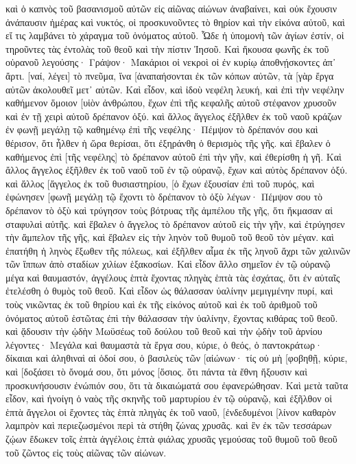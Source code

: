 καὶ ὁ καπνὸς τοῦ βασανισμοῦ αὐτῶν εἰς αἰῶνας αἰώνων ἀναβαίνει, καὶ οὐκ ἔχουσιν ἀνάπαυσιν ἡμέρας καὶ νυκτός, οἱ προσκυνοῦντες τὸ θηρίον καὶ τὴν εἰκόνα αὐτοῦ, καὶ εἴ τις λαμβάνει τὸ χάραγμα τοῦ ὀνόματος αὐτοῦ. 
Ὧδε ἡ ὑπομονὴ τῶν ἁγίων ἐστίν, οἱ τηροῦντες τὰς ἐντολὰς τοῦ θεοῦ καὶ τὴν πίστιν Ἰησοῦ. 
Καὶ ἤκουσα φωνῆς ἐκ τοῦ οὐρανοῦ λεγούσης· Γράψον· Μακάριοι οἱ νεκροὶ οἱ ἐν κυρίῳ ἀποθνῄσκοντες ἀπ᾽ ἄρτι. [ναί, λέγει] τὸ πνεῦμα, ἵνα [ἀναπαήσονται ἐκ τῶν κόπων αὐτῶν, τὰ [γὰρ ἔργα αὐτῶν ἀκολουθεῖ μετ᾽ αὐτῶν. 
Καὶ εἶδον, καὶ ἰδοὺ νεφέλη λευκή, καὶ ἐπὶ τὴν νεφέλην καθήμενον ὅμοιον [υἱὸν ἀνθρώπου, ἔχων ἐπὶ τῆς κεφαλῆς αὐτοῦ στέφανον χρυσοῦν καὶ ἐν τῇ χειρὶ αὐτοῦ δρέπανον ὀξύ. 
καὶ ἄλλος ἄγγελος ἐξῆλθεν ἐκ τοῦ ναοῦ κράζων ἐν φωνῇ μεγάλῃ τῷ καθημένῳ ἐπὶ τῆς νεφέλης· Πέμψον τὸ δρέπανόν σου καὶ θέρισον, ὅτι ἦλθεν ἡ ὥρα θερίσαι, ὅτι ἐξηράνθη ὁ θερισμὸς τῆς γῆς. 
καὶ ἔβαλεν ὁ καθήμενος ἐπὶ [τῆς νεφέλης] τὸ δρέπανον αὐτοῦ ἐπὶ τὴν γῆν, καὶ ἐθερίσθη ἡ γῆ. 
Καὶ ἄλλος ἄγγελος ἐξῆλθεν ἐκ τοῦ ναοῦ τοῦ ἐν τῷ οὐρανῷ, ἔχων καὶ αὐτὸς δρέπανον ὀξύ. 
καὶ ἄλλος [ἄγγελος ἐκ τοῦ θυσιαστηρίου, [ὁ ἔχων ἐξουσίαν ἐπὶ τοῦ πυρός, καὶ ἐφώνησεν [φωνῇ μεγάλῃ τῷ ἔχοντι τὸ δρέπανον τὸ ὀξὺ λέγων· Πέμψον σου τὸ δρέπανον τὸ ὀξὺ καὶ τρύγησον τοὺς βότρυας τῆς ἀμπέλου τῆς γῆς, ὅτι ἤκμασαν αἱ σταφυλαὶ αὐτῆς. 
καὶ ἔβαλεν ὁ ἄγγελος τὸ δρέπανον αὐτοῦ εἰς τὴν γῆν, καὶ ἐτρύγησεν τὴν ἄμπελον τῆς γῆς, καὶ ἔβαλεν εἰς τὴν ληνὸν τοῦ θυμοῦ τοῦ θεοῦ τὸν μέγαν. 
καὶ ἐπατήθη ἡ ληνὸς ἔξωθεν τῆς πόλεως, καὶ ἐξῆλθεν αἷμα ἐκ τῆς ληνοῦ ἄχρι τῶν χαλινῶν τῶν ἵππων ἀπὸ σταδίων χιλίων ἑξακοσίων. 
Καὶ εἶδον ἄλλο σημεῖον ἐν τῷ οὐρανῷ μέγα καὶ θαυμαστόν, ἀγγέλους ἑπτὰ ἔχοντας πληγὰς ἑπτὰ τὰς ἐσχάτας, ὅτι ἐν αὐταῖς ἐτελέσθη ὁ θυμὸς τοῦ θεοῦ. 
Καὶ εἶδον ὡς θάλασσαν ὑαλίνην μεμιγμένην πυρί, καὶ τοὺς νικῶντας ἐκ τοῦ θηρίου καὶ ἐκ τῆς εἰκόνος αὐτοῦ καὶ ἐκ τοῦ ἀριθμοῦ τοῦ ὀνόματος αὐτοῦ ἑστῶτας ἐπὶ τὴν θάλασσαν τὴν ὑαλίνην, ἔχοντας κιθάρας τοῦ θεοῦ. 
καὶ ᾄδουσιν τὴν ᾠδὴν Μωϋσέως τοῦ δούλου τοῦ θεοῦ καὶ τὴν ᾠδὴν τοῦ ἀρνίου λέγοντες· Μεγάλα καὶ θαυμαστὰ τὰ ἔργα σου, κύριε, ὁ θεός, ὁ παντοκράτωρ· δίκαιαι καὶ ἀληθιναὶ αἱ ὁδοί σου, ὁ βασιλεὺς τῶν [αἰώνων· 
τίς οὐ μὴ [φοβηθῇ, κύριε, καὶ [δοξάσει τὸ ὄνομά σου, ὅτι μόνος [ὅσιος. ὅτι πάντα τὰ ἔθνη ἥξουσιν καὶ προσκυνήσουσιν ἐνώπιόν σου, ὅτι τὰ δικαιώματά σου ἐφανερώθησαν. 
Καὶ μετὰ ταῦτα εἶδον, καὶ ἠνοίγη ὁ ναὸς τῆς σκηνῆς τοῦ μαρτυρίου ἐν τῷ οὐρανῷ, 
καὶ ἐξῆλθον οἱ ἑπτὰ ἄγγελοι οἱ ἔχοντες τὰς ἑπτὰ πληγὰς ἐκ τοῦ ναοῦ, [ἐνδεδυμένοι [λίνον καθαρὸν λαμπρὸν καὶ περιεζωσμένοι περὶ τὰ στήθη ζώνας χρυσᾶς. 
καὶ ἓν ἐκ τῶν τεσσάρων ζῴων ἔδωκεν τοῖς ἑπτὰ ἀγγέλοις ἑπτὰ φιάλας χρυσᾶς γεμούσας τοῦ θυμοῦ τοῦ θεοῦ τοῦ ζῶντος εἰς τοὺς αἰῶνας τῶν αἰώνων. 

